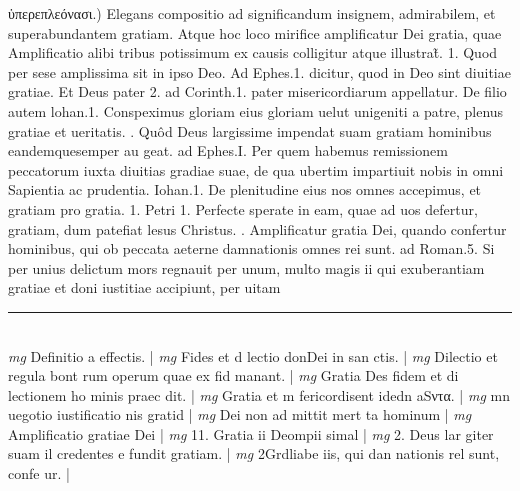 \documentclass{article}
\begin{document}
\begin{pages}
ὑπερεπλεόνασι.) Elegans compositio ad significandum insignem, admirabilem, et superabundantem gratiam. Atque hoc loco mirifice amplificatur Dei gratia, quae Amplificatio alibi tribus potissimum ex causis colligitur atque illustrat̃. 1. Quod per sese amplissima sit in ipso Deo. Ad Ephes.1. dicitur, quod in Deo sint diuitiae gratiae. Et Deus pater 2. ad Corinth.1. pater misericordiarum appellatur. De filio autem lohan.1. Conspeximus gloriam eius gloriam uelut unigeniti a patre, plenus gratiae et ueritatis.  \pend{}. Quôd Deus largissime impendat suam gratiam hominibus eandemquesemper au geat. ad Ephes.I. Per quem habemus remissionem peccatorum iuxta diuitias gradiae suae, de qua ubertim impartiuit nobis in omni Sapientia ac prudentia. Iohan.1. De plenitudine eius nos omnes accepimus, et gratiam pro gratia. 1. Petri 1. Perfecte sperate in eam, quae ad uos defertur, gratiam, dum patefiat lesus Christus.  \pend{}. Amplificatur gratia Dei, quando confertur hominibus, qui ob peccata aeterne damnationis omnes rei sunt. ad Roman.5. Si per unius delictum mors regnauit per unum, multo magis ii qui exuberantiam gratiae et doni iustitiae accipiunt, per uitam  \pend
\vspace{0.5cm}\noindent
\vspace{0.2cm}\rule{1cm}{0.2pt}\\ 
\hspace{0.2cm}\textit{mg}
\footnotesize Definitio a effectis. 
\normalsize| 
\hspace{0.2cm}\textit{mg}
\footnotesize Fides et d lectio donDei in san ctis. 
\normalsize| 
\hspace{0.2cm}\textit{mg}
\footnotesize Dilectio et regula bont rum operum quae ex fid manant. 
\normalsize| 
\hspace{0.2cm}\textit{mg}
\footnotesize Gratia Des fidem et di lectionem ho minis praec dit. 
\normalsize| 
\hspace{0.2cm}\textit{mg}
\footnotesize Gratia et m fericordisent idedn aSντα. 
\normalsize| 
\hspace{0.2cm}\textit{mg}
\footnotesize mn uegotio iustificatio nis gratid 
\normalsize| 
\hspace{0.2cm}\textit{mg}
\footnotesize Dei non ad mittit mert ta hominum 
\normalsize| 
\hspace{0.2cm}\textit{mg}
\footnotesize Amplificatio gratiae Dei 
\normalsize| 
\hspace{0.2cm}\textit{mg}
\footnotesize 11. Gratia ii Deompii simal 
\normalsize| 
\hspace{0.2cm}\textit{mg}
\footnotesize 2. Deus lar giter suam il credentes e fundit gratiam. 
\normalsize| 
\hspace{0.2cm}\textit{mg}
\footnotesize 2Grdliabe iis, qui dan nationis rel sunt, confe ur. 
\normalsize| 

\end{pages}
\end{document}
